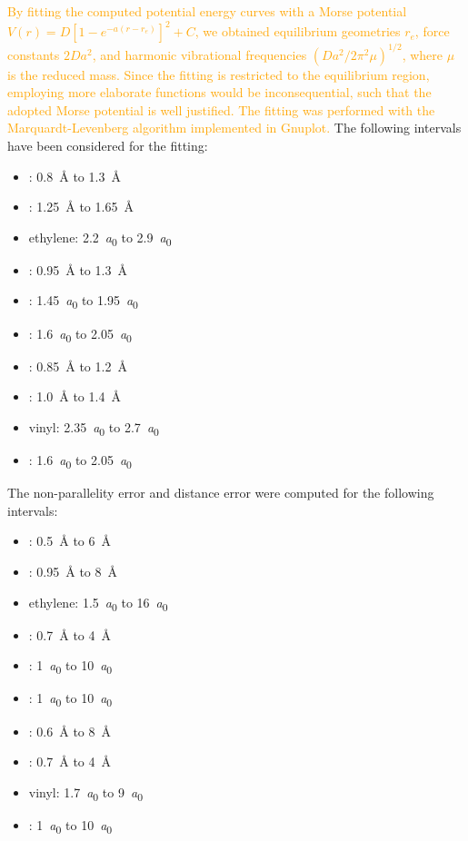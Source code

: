 \documentclass[aip,jcp,preprint,noshowkeys,superscriptaddress]{revtex4-1}
\newcommand{\fk}[1]{\textcolor{orange}{#1}}
\begin{document}
\fk{
By fitting the computed potential energy curves with a Morse potential $V(r) = D [1 - e^{-a(r-r_e)}]^2 + C $,
we obtained equilibrium geometries $r_e$, force constants $2Da^2$, and harmonic vibrational frequencies $\left( Da^2/2\pi^2\mu \right)^{1/2}$,
where $\mu$ is the reduced mass.
Since the fitting is restricted to the equilibrium region, employing more elaborate functions would be inconsequential, such that the adopted Morse potential is well justified.
The fitting was performed with the Marquardt-Levenberg algorithm implemented in Gnuplot.
}
The following intervals have been considered for the fitting:
\begin{itemize}
\item {}: \SI{0.8}{\angstrom} to \SI{1.3}{\angstrom}
\item {}: \SI{1.25}{\angstrom} to \SI{1.65}{\angstrom}
\item ethylene: \SI{2.2}{\bohr} to \SI{2.9}{\bohr}
\item {}: \SI{0.95}{\angstrom} to \SI{1.3}{\angstrom}
\item {}: \SI{1.45}{\bohr} to \SI{1.95}{\bohr}
\item {}: \SI{1.6}{\bohr} to \SI{2.05}{\bohr}
\item {}: \SI{0.85}{\angstrom} to \SI{1.2}{\angstrom}
\item {}: \SI{1.0}{\angstrom} to \SI{1.4}{\angstrom}
\item vinyl: \SI{2.35}{\bohr} to \SI{2.7}{\bohr}
\item {}: \SI{1.6}{\bohr} to \SI{2.05}{\bohr}
\end{itemize}

\clearpage

The non-parallelity error and distance error were computed for the following intervals:
\begin{itemize}
\item {}: \SI{0.5}{\angstrom} to \SI{6}{\angstrom}
\item {}: \SI{0.95}{\angstrom} to \SI{8}{\angstrom}
\item ethylene: \SI{1.5}{\bohr} to \SI{16}{\bohr}
\item {}: \SI{0.7}{\angstrom} to \SI{4}{\angstrom}
\item {}: \SI{1}{\bohr} to \SI{10}{\bohr}
\item {}: \SI{1}{\bohr} to \SI{10}{\bohr}
\item {}: \SI{0.6}{\angstrom} to \SI{8}{\angstrom}
\item {}: \SI{0.7}{\angstrom} to \SI{4}{\angstrom}
\item vinyl: \SI{1.7}{\bohr} to \SI{9}{\bohr}
\item {}: \SI{1}{\bohr} to \SI{10}{\bohr}
\end{itemize}
\end{document}
